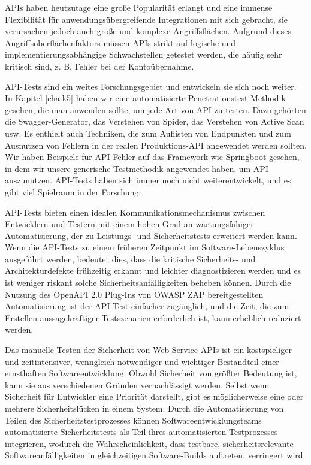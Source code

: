 
APIs haben heutzutage eine große Popularität erlangt und eine immense Flexibilität für anwendungsübergreifende Integrationen mit sich gebracht, sie verursachen jedoch auch große und komplexe Angriffsflächen. Aufgrund dieses Angriffsoberflächenfaktors müssen APIs strikt auf logische und implementierungsabhängige Schwachstellen getestet werden, die häufig sehr kritisch sind, z. B. Fehler bei der Kontoübernahme.

API-Tests sind ein weites Forschungsgebiet und entwickeln sie sich noch weiter. In Kapitel \ref{cha:k5} haben wir eine automatisierte Penetrationstest-Methodik gesehen, die man anwenden sollte, um jede Art von API zu testen. Dazu gehörten die Swagger-Generator, das Verstehen von Spider, das Verstehen von Active Scan usw. Es enthielt auch Techniken, die zum Auflisten von Endpunkten und zum Ausnutzen von Fehlern in der realen Produktions-API angewendet werden sollten. Wir haben Beispiele für API-Fehler auf das Framework wie Springboot gesehen, in dem wir unsere generische Testmethodik angewendet haben, um API auszunutzen. API-Tests haben sich immer noch nicht weiterentwickelt, und es gibt viel Spielraum in der Forschung.

API-Tests bieten einen idealen Kommunikationsmechanismus zwischen Entwicklern und Testern mit einem hohen Grad an wartungsfähiger Automatisierung, der zu Leistungs- und Sicherheitstests erweitert werden kann. Wenn die API-Tests zu einem früheren Zeitpunkt im Software-Lebenszyklus ausgeführt werden, bedeutet dies, dass die kritische Sicherheits- und Architekturdefekte frühzeitig erkannt und leichter diagnostizieren werden und es ist weniger riskant solche Sicherheitsanfälligkeiten beheben können. Durch die Nutzung des OpenAPI 2.0 Plug-Ins von OWASP ZAP bereitgestellten Automatisierung ist der API-Test einfacher zugänglich, und die Zeit, die zum Erstellen aussagekräftiger Testszenarien erforderlich ist, kann erheblich reduziert werden.

Das manuelle Testen der Sicherheit von Web-Service-APIs ist ein kostspieliger und zeitintensiver, wenngleich notwendiger und wichtiger Bestandteil einer ernsthaften Softwareentwicklung. Obwohl Sicherheit von größter Bedeutung ist, kann sie aus verschiedenen Gründen vernachlässigt werden. Selbst wenn Sicherheit für Entwickler eine Priorität darstellt, gibt es möglicherweise eine oder mehrere Sicherheitslücken in einem System. Durch die Automatisierung von Teilen des Sicherheitstestprozesses können Softwareentwicklungsteams automatisierte Sicherheitstests als Teil ihres automatisierten Testprozesses integrieren, wodurch die Wahrscheinlichkeit, dass testbare, sicherheitsrelevante Softwareanfälligkeiten in gleichzeitigen Software-Builds auftreten, verringert wird.\\

